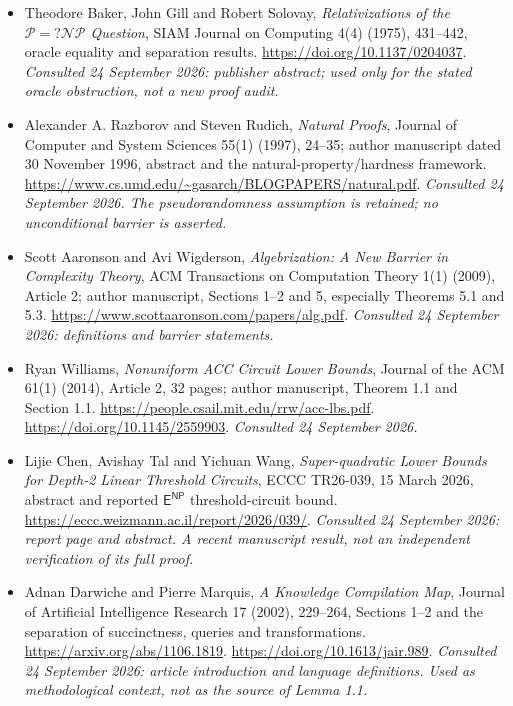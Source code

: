\documentclass[11pt]{article}
\begin{document}
\begin{itemize}
\item[\textnormal{[E2]}]\hypertarget{extra:1:2}{} Theodore Baker, John Gill and
Robert Solovay, \emph{Relativizations of the $\mathcal P=?\mathcal{NP}$ Question},
SIAM Journal on Computing 4(4) (1975), 431--442, oracle equality and separation
results. \url{https://doi.org/10.1137/0204037}.
{\small\textit{Consulted 24 September 2026: publisher abstract; used only for
the stated oracle obstruction, not a new proof audit.}}
\item[\textnormal{[E3]}]\hypertarget{extra:1:3}{} Alexander A. Razborov and Steven
Rudich, \emph{Natural Proofs}, Journal of Computer and System Sciences 55(1)
(1997), 24--35; author manuscript dated 30 November 1996, abstract and the
natural-property/hardness framework.
\url{https://www.cs.umd.edu/~gasarch/BLOGPAPERS/natural.pdf}.
{\small\textit{Consulted 24 September 2026. The pseudorandomness assumption is
retained; no unconditional barrier is asserted.}}
\item[\textnormal{[E4]}]\hypertarget{extra:1:4}{} Scott Aaronson and Avi Wigderson,
\emph{Algebrization: A New Barrier in Complexity Theory}, ACM Transactions on
Computation Theory 1(1) (2009), Article 2; author manuscript, Sections 1--2
and 5, especially Theorems 5.1 and 5.3.
\url{https://www.scottaaronson.com/papers/alg.pdf}.
{\small\textit{Consulted 24 September 2026: definitions and barrier statements.}}
\item[\textnormal{[E5]}]\hypertarget{extra:1:5}{} Ryan Williams,
\emph{Nonuniform ACC Circuit Lower Bounds}, Journal of the ACM 61(1) (2014),
Article 2, 32 pages; author manuscript, Theorem 1.1 and Section 1.1.
\url{https://people.csail.mit.edu/rrw/acc-lbs.pdf}.
\url{https://doi.org/10.1145/2559903}.
{\small\textit{Consulted 24 September 2026.}}
\item[\textnormal{[E6]}]\hypertarget{extra:1:6}{} Lijie Chen, Avishay Tal and
Yichuan Wang, \emph{Super-quadratic Lower Bounds for Depth-2 Linear Threshold
Circuits}, ECCC TR26-039, 15 March 2026, abstract and reported
$\mathsf E^{\mathsf{NP}}$ threshold-circuit bound.
\url{https://eccc.weizmann.ac.il/report/2026/039/}.
{\small\textit{Consulted 24 September 2026: report page and abstract. A
recent manuscript result, not an independent verification of its full proof.}}
\item[\textnormal{[E7]}]\hypertarget{extra:1:7}{} Adnan Darwiche and Pierre
Marquis, \emph{A Knowledge Compilation Map}, Journal of Artificial Intelligence
Research 17 (2002), 229--264, Sections 1--2 and the separation of succinctness,
queries and transformations.
\url{https://arxiv.org/abs/1106.1819}.
\url{https://doi.org/10.1613/jair.989}.
{\small\textit{Consulted 24 September 2026: article introduction and language
definitions. Used as methodological context, not as the source of Lemma 1.1.}}
\end{itemize}
\end{document}
